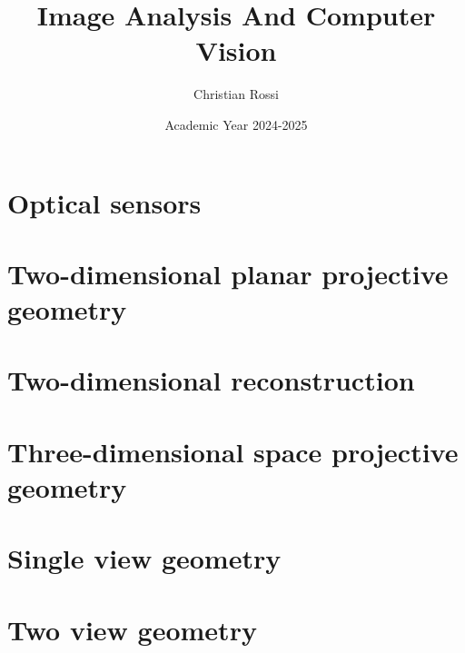 \documentclass[12pt, a4paper]{report}
\title{\textbf{Image Analysis And Computer Vision}}
\author{Christian Rossi}
\date{Academic Year 2024-2025}
\begin{document}
    \maketitle

    

    \cleardoublepage

    \tableofcontents

    \cleardoublepage

    \chapter{Optical sensors}
    
      
    
    
    
    
    

    \chapter{Two-dimensional planar projective geometry}
    
    
    
    
    
    

    \chapter{Two-dimensional reconstruction}
    
    
    
    

    \chapter{Three-dimensional space projective geometry}
    
    
    
    
    
    

    \chapter{Single view geometry}
    
    
    
    
    

    \chapter{Two view geometry}





    
\end{document}
